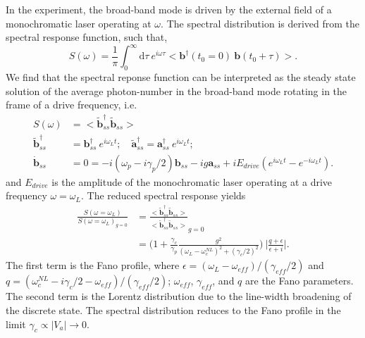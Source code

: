 \documentclass[12pt]{article}
\begin{document}
In the experiment, the broad-band mode is driven by the external
field of a monochromatic laser operating at $\omega$. The spectral 
distribution is derived from the spectral response function, such that,
\begin{equation}
S(\omega) = \frac{1}{\pi} \int_0^{\infty} \mathrm{d}\tau \: 
    e^{i \omega \tau} 
    <\mathbf{b}^{\dagger}(t_0=0) \: \mathbf{b}(t_0 + \tau)>.
\end{equation}
We find that the spectral reponse function can be interpreted as the steady 
state solution of the average photon-number in the broad-band mode rotating 
in the frame of a drive frequency, i.e.
\begin{align}
S(\omega) &= < \tilde{ \mathbf{b} }^{\dagger}_{ss}\tilde{ \mathbf{b} }_{ss} >
\\
\tilde{ \mathbf{b} }^{\dagger}_{ss} &= 
    \mathbf{b}^{\dagger}_{ss} \: e^{i \omega_L t}; \quad
    \tilde{ \mathbf{a} }^{\dagger}_{ss} =
    \mathbf{a}^{\dagger}_{ss} \: e^{i \omega_L t};
\\
\dot{ \mathbf{b} }_{ss} &= 0 =
    -i ( \omega_p - i\gamma_p/2 )\mathbf{b}_{ss} - ig\mathbf{a}_{ss}
    + iE_{drive}( e^{i \omega_L t} - e^{-i \omega_L t} ).
\end{align}
and $E_{drive}$ is the amplitude of the monochromatic laser operating at
a drive frequency $\omega = \omega_L$. The reduced spectral response yields
\begin{equation}
\begin{split}
\frac{ S(\omega = \omega_L) }{ S(\omega = \omega_L)_{g=0} } &= 
    \frac{< \tilde{ \mathbf{b} }^{\dagger}_{ss}\tilde{ \mathbf{b} }_{ss} >}
        {<\tilde{ \mathbf{b} }^{\dagger}_{ss}\tilde{ \mathbf{b} }_{ss} >}_{g=0}
\\
&= \Bigg( 1 +
    \frac{\gamma_c}{\gamma_p}
    \frac{g^2}{(\omega_L - \omega_c^{NL})^2 + (\gamma_c/2)^2}
    \Bigg) \:
    \bigg| \frac{q + \epsilon}{\epsilon + i} \bigg|.
\end{split}
\end{equation}
The first term is the Fano profile, where 
$\epsilon=(\omega_L - \omega_{eff})/(\gamma_{eff}/2)$ and 
$q = (\omega_c^{NL} - i\gamma_c/2 - \omega_{eff})/(\gamma_{eff}/2)$;
$\omega_{eff}$, $\gamma_{eff}$, and $q$ are the Fano parameters. The second
term is the Lorentz distribution due to the line-width broadening of the
discrete state. The spectral distribution reduces to the Fano profile in the
limit $\gamma_c \propto |V_a| \rightarrow 0$.
\end{document}
